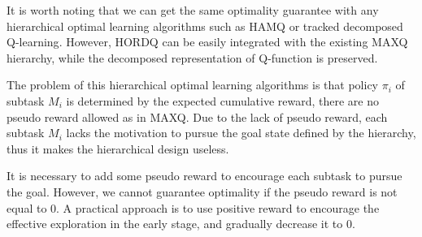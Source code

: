 \documentclass{article} %
\newtheorem{theorem}{Theorem}
\begin{document}
It is worth noting that we can get the same optimality guarantee with any 
hierarchical optimal learning algorithms such as HAMQ\cite{HAMQ} or tracked decomposed Q-learning\cite{HORDQ}. However, HORDQ can be easily integrated with 
the existing MAXQ hierarchy, while the decomposed representation of Q-function is preserved.

The problem of this hierarchical optimal learning algorithms is that policy $\pi_i$ of subtask $M_i$
is determined by the expected cumulative reward, there are no pseudo reward allowed as
in MAXQ. Due to the lack of pseudo reward, each subtask $M_i$ lacks the motivation to 
pursue the goal state defined by the hierarchy, thus it makes the hierarchical 
design useless. 

It is necessary to add some pseudo reward to encourage each subtask to pursue 
the goal. However, we cannot guarantee optimality if the pseudo reward is not equal to 0.
A practical approach is to use positive reward to encourage the effective exploration
in the early stage, and gradually decrease it to 0. 





\end{document}
